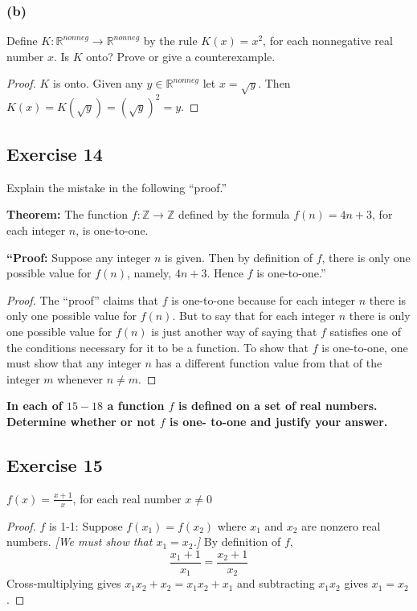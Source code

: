 \documentclass[14pt]{extarticle}
\newcommand{\dps}{\displaystyle}
\newcommand{\R}{\mathbb{R}}
\newcommand{\Z}{\mathbb{Z}}
\newcommand{\cy}{\color{cyan}}
\begin{document}
\subsubsection{(b)}
Define \(K: \R^{nonneg} \to \R^{nonneg}\) by the rule \(K(x) = x^2\), for each nonnegative real number $x$.
Is $K$ onto? Prove or give a counterexample.

\begin{proof}
    $K$ is onto. Given any \(y \in \R^{nonneg}\) let \(x = \sqrt{y}\). Then \(K(x) = K(\sqrt{y}) = (\sqrt{y})^2 = y\).
\end{proof}

\subsection{Exercise 14}
Explain the mistake in the following “proof.”

{\bf Theorem:} The function \(f: \Z \to \Z\) defined by the formula \(f(n) = 4n + 3\), for each integer $n$, is one-to-one.

{\bf “Proof:} Suppose any integer $n$ is given. Then by definition of $f$, there is only one possible value for
$f(n)$, namely, \(4n + 3\). Hence $f$ is one-to-one.”

\begin{proof}
    The “proof” claims that $f$ is one-to-one because for each integer $n$ there is only one possible value for $f(n)$.
    But to say that for each integer $n$ there is only one possible value for $f(n)$ is just another way of saying
    that $f$ satisfies one of the conditions necessary for it to be a function. To show that $f$ is one-to-one, one must
    show that any integer $n$ has a different function value from that of the integer $m$ whenever \(n \neq m\).
\end{proof}

{\bf \cy In each of $15-18$ a function $f$ is defined on a set of real numbers. Determine whether or not $f$ is one-
to-one and justify your answer.}

\subsection{Exercise 15}
\(\dps f(x) = \frac{x+1}{x}\), for each real number \(x \neq 0\)

\begin{proof}
    $f$ is 1-1: Suppose \(f(x_1) = f(x_2)\) where $x_1$ and $x_2$ are nonzero real numbers. {\it [We must show that
                \(x_1 = x_2\).]} By definition of $f$,
    \[
        \frac{x_1 + 1}{x_1} = \frac{x_2 + 1}{x_2}
    \]
    Cross-multiplying gives \(x_1x_2 + x_2 = x_1x_2 + x_1\) and subtracting $x_1x_2$ gives \(x_1 = x_2\).
\end{proof}
\end{document}
